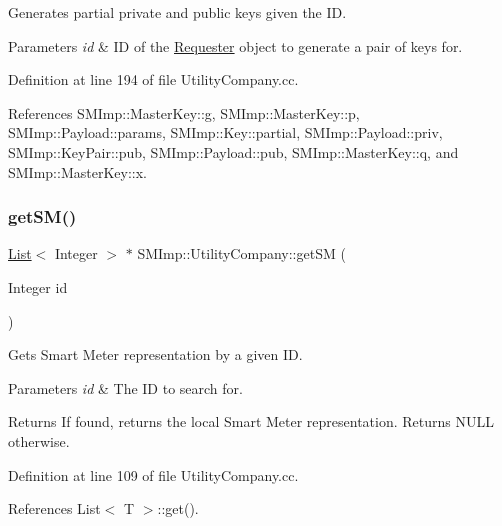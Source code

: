 Generates partial private and public keys given the ID. 
\begin{DoxyParams}{Parameters}
{\em id} & ID of the \hyperlink{classSMImp_1_1Requester}{Requester} object to generate a pair of keys for. \\
\hline
\end{DoxyParams}


Definition at line 194 of file Utility\+Company.\+cc.



References S\+M\+Imp\+::\+Master\+Key\+::g, S\+M\+Imp\+::\+Master\+Key\+::p, S\+M\+Imp\+::\+Payload\+::params, S\+M\+Imp\+::\+Key\+::partial, S\+M\+Imp\+::\+Payload\+::priv, S\+M\+Imp\+::\+Key\+Pair\+::pub, S\+M\+Imp\+::\+Payload\+::pub, S\+M\+Imp\+::\+Master\+Key\+::q, and S\+M\+Imp\+::\+Master\+Key\+::x.

\mbox{\label{classSMImp_1_1UtilityCompany_a24c3df26cca4ca6ea6855464f2db5249}} 
\subsubsection{\texorpdfstring{get\+S\+M()}{getSM()}}
{\footnotesize\ttfamily \hyperlink{classList}{List}$<$ Integer $>$ $\ast$ S\+M\+Imp\+::\+Utility\+Company\+::get\+SM (\begin{DoxyParamCaption}\item[{Integer}]{id }\end{DoxyParamCaption})}

Gets Smart Meter representation by a given ID. 
\begin{DoxyParams}{Parameters}
{\em id} & The ID to search for. \\
\hline
\end{DoxyParams}
\begin{DoxyReturn}{Returns}
If found, returns the local Smart Meter representation. Returns N\+U\+LL otherwise. 
\end{DoxyReturn}


Definition at line 109 of file Utility\+Company.\+cc.



References List$<$ T $>$\+::get().

\mbox{\label{classSMImp_1_1UtilityCompany_a76d86a7b253eeb6652dc537d756cbdaf}} 
